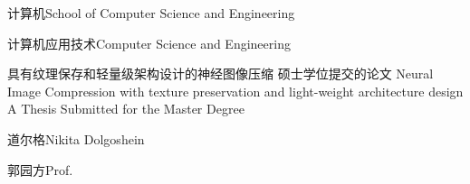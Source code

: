 
\school
{计算机}{School of Computer Science and Engineering}

\major
{计算机应用技术}{Computer Science and Engineering}

\thesistitle
{具有纹理保存和轻量级架构设计的神经图像压缩}
{硕士学位提交的论文}
{Neural Image Compression with texture preservation and light-weight architecture design}
{A Thesis Submitted for the Master Degree}

\thesisauthor
{道尔格}{Nikita Dolgoshein}

\teacher
{郭园方}{Prof.}






